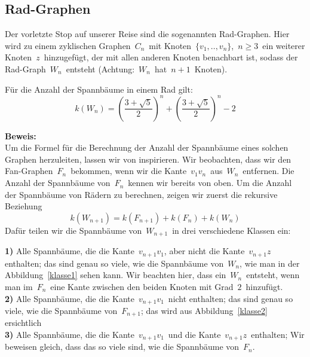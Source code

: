 \subsection{Rad-Graphen}
Der vorletzte Stop auf unserer Reise sind die sogenannten Rad-Graphen. Hier wird zu einem zyklischen Graphen $\,C_n\,$ mit Knoten $\,\{v_1,..,v_n\}$,\; $\,n \geq 3\,$ ein weiterer Knoten $\,z\,$ hinzugefügt, der mit allen anderen Knoten benachbart ist, sodass der Rad-Graph $\,W_{n}\,$ entsteht (Achtung: $\,W_n\,$ hat $\,n+1\,$ Knoten).
\begin{Tm}
Für die Anzahl der Spannbäume in einem Rad gilt:
\begin{equation}
 \mathit{k}\left(W_n\right) = \left(\frac{3+\sqrt{5}}{2}\right)^n+\left(\frac{3+\sqrt{5}}{2}\right)^n-2
 \label{wn}
\end{equation}
\end{Tm}
\textbf{Beweis:}\\
Um die Formel für die Berechnung der Anzahl der Spannbäume eines solchen Graphen herzuleiten, lassen wir von \cite{sedlacek_1970} inspirieren.
Wir beobachten, dass wir den Fan-Graphen $\,F_n\,$ bekommen, wenn wir die Kante $\,v_1v_n\,$ aus $\,W_n\,$ entfernen.
Die Anzahl der Spannbäume von $\,F_n\,$ kennen wir bereits von oben.
Um die Anzahl der Spannbäume von Rädern zu berechnen, zeigen wir zuerst die rekursive Beziehung
\begin{equation*}
 \mathit{k}\left(W_{n+1}\right) = \mathit{k}\left(F_{n+1}\right) + \mathit{k}\left(F_n\right) + \mathit{k}\left(W_n\right)
\end{equation*}
Dafür teilen wir die Spannbäume von $\,W_{n+1}\,$ in drei verschiedene Klassen ein:\\
\par
\begingroup
\leftskip=20pt
\rightskip=20pt
\noindent
\textbf{1)} Alle Spannbäume, die die Kante $\,v_{n+1}v_1$,\; aber nicht die Kante $\,v_{n+1}z\,$ enthalten; das sind genau so viele, wie die Spannbäume von $\,W_n$,\; wie man in der Abbildung~\ref{klasse1} sehen kann. Wir beachten hier, dass ein $\,W_n\,$ entsteht, wenn man im $\,F_n\,$ eine Kante zwischen den beiden Knoten mit Grad $\,2\,$ hinzufügt.\\
\textbf{2)} Alle Spannbäume, die die Kante $\,v_{n+1}v_1\,$ nicht enthalten; das sind genau so viele, wie die Spannbäume von $\,F_{n+1}$; das wird aus Abbildung~\ref{klasse2} ersichtlich\\
\textbf{3)} Alle Spannbäume, die die Kante $\,v_{n+1}v_1\,$ und die Kante $\,v_{n+1}z\,$ enthalten; Wir beweisen gleich, dass das so viele sind, wie die Spannbäume von $\,F_n$.\; \\
